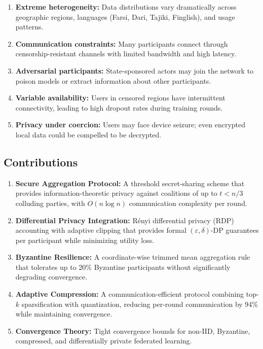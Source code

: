 \documentclass[11pt,a4paper]{article}
\begin{document}
\begin{enumerate}[label=(\arabic*)]
    \item \textbf{Extreme heterogeneity:} Data distributions vary dramatically across geographic regions, languages (Farsi, Dari, Tajiki, Finglish), and usage patterns.
    \item \textbf{Communication constraints:} Many participants connect through censorship-resistant channels with limited bandwidth and high latency.
    \item \textbf{Adversarial participants:} State-sponsored actors may join the network to poison models or extract information about other participants.
    \item \textbf{Variable availability:} Users in censored regions have intermittent connectivity, leading to high dropout rates during training rounds.
    \item \textbf{Privacy under coercion:} Users may face device seizure; even encrypted local data could be compelled to be decrypted.
\end{enumerate}

\subsection{Contributions}

\begin{enumerate}[label=(\roman*)]
    \item \textbf{Secure Aggregation Protocol:} A threshold secret-sharing scheme that provides information-theoretic privacy against coalitions of up to $t < n/3$ colluding parties, with $O(n \log n)$ communication complexity per round.
    \item \textbf{Differential Privacy Integration:} R\'enyi differential privacy (RDP) accounting with adaptive clipping that provides formal $(\varepsilon, \delta)$-DP guarantees per participant while minimizing utility loss.
    \item \textbf{Byzantine Resilience:} A coordinate-wise trimmed mean aggregation rule that tolerates up to 20\% Byzantine participants without significantly degrading convergence.
    \item \textbf{Adaptive Compression:} A communication-efficient protocol combining top-$k$ sparsification with quantization, reducing per-round communication by 94\% while maintaining convergence.
    \item \textbf{Convergence Theory:} Tight convergence bounds for non-IID, Byzantine, compressed, and differentially private federated learning.
\end{enumerate}
\end{document}
